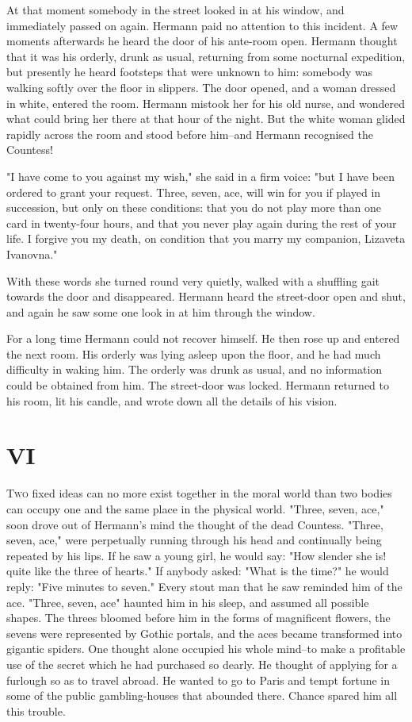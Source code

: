 At that moment somebody in the street looked in at his window, and
immediately passed on again. Hermann paid no attention to this
incident. A few moments afterwards he heard the door of his ante-room
open. Hermann thought that it was his orderly, drunk as usual,
returning from some nocturnal expedition, but presently he heard
footsteps that were unknown to him: somebody was walking softly over
the floor in slippers. The door opened, and a woman dressed in white,
entered the room. Hermann mistook her for his old nurse, and wondered
what could bring her there at that hour of the night. But the white
woman glided rapidly across the room and stood before him--and Hermann
recognised the Countess!

"I have come to you against my wish," she said in a firm voice: "but I
have been ordered to grant your request. Three, seven, ace, will win
for you if played in succession, but only on these conditions: that
you do not play more than one card in twenty-four hours, and that you
never play again during the rest of your life. I forgive you my death,
on condition that you marry my companion, Lizaveta Ivanovna."

With these words she turned round very quietly, walked with a
shuffling gait towards the door and disappeared. Hermann heard the
street-door open and shut, and again he saw some one look in at him
through the window.

For a long time Hermann could not recover himself. He then rose up and
entered the next room. His orderly was lying asleep upon the floor,
and he had much difficulty in waking him. The orderly was drunk as
usual, and no information could be obtained from him. The street-door
was locked. Hermann returned to his room, lit his candle, and wrote
down all the details of his vision.



\section{VI}


\lettrine[lines=3,lhang=0.11,lraise=0,loversize=0.05]{T}{wo}
fixed ideas can no more exist together in the moral world than two
bodies can occupy one and the same place in the physical world.
"Three, seven, ace," soon drove out of Hermann's mind the thought of
the dead Countess. "Three, seven, ace," were perpetually running
through his head and continually being repeated by his lips. If he saw
a young girl, he would say: "How slender she is! quite like the three
of hearts." If anybody asked: "What is the time?" he would reply:
"Five minutes to seven." Every stout man that he saw reminded him of
the ace. "Three, seven, ace" haunted him in his sleep, and assumed all
possible shapes. The threes bloomed before him in the forms of
magnificent flowers, the sevens were represented by Gothic portals,
and the aces became transformed into gigantic spiders. One thought
alone occupied his whole mind--to make a profitable use of the secret
which he had purchased so dearly. He thought of applying for a
furlough so as to travel abroad. He wanted to go to Paris and tempt
fortune in some of the public gambling-houses that abounded there.
Chance spared him all this trouble.

